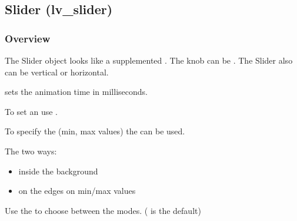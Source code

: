 \documentclass[letterpaper,10pt,english]{sphinxmanual}
\begin{document}
\subsection{Slider (lv\_slider)}
\label{\detokenize{object-types/slider:slider-lv-slider}}\label{\detokenize{object-types/slider::doc}}

\subsubsection{Overview}
\label{\detokenize{object-types/slider:overview}}
The Slider object looks like a {\hyperref[\detokenize{object-types/bar::doc}]{}} supplemented . The knob can be . The Slider also can be vertical or horizontal.

 sets the animation time in milliseconds.

To set an  use .

To specify the  (min, max values) the  can be used.

The  two ways:
\begin{itemize}
\item {} 
inside the background

\item {} 
on the edges on min/max values

\end{itemize}

Use the  to choose between the modes. ( is the default)
\end{document}
